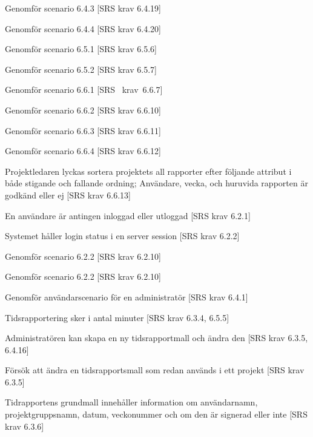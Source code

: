 \documentclass[a4paper]{article}
\begin{document}
\begin{appendices}
\begin{ST}
\item
Genomför scenario 6.4.3 [SRS krav 6.4.19]

\item
Genomför scenario 6.4.4 [SRS krav 6.4.20]

\item
Genomför scenario 6.5.1 [SRS krav 6.5.6]

\item
Genomför scenario 6.5.2 [SRS krav 6.5.7]

\item
Genomför scenario 6.6.1 [SRS~ krav~6.6.7]

\item
Genomför scenario 6.6.2 [SRS krav 6.6.10]

\item
Genomför scenario 6.6.3 [SRS krav 6.6.11]

\item
Genomför scenario 6.6.4 [SRS krav 6.6.12]

\item
Projektledaren lyckas sortera projektets all rapporter efter följande attribut i både stigande och fallande ordning; Användare, vecka, och huruvida rapporten är godkänd eller ej [SRS krav 6.6.13]


\item
En användare är antingen inloggad eller utloggad [SRS krav 6.2.1]

\item
Systemet håller login status i en server session [SRS krav 6.2.2]

\item
Genomför scenario 6.2.2 [SRS krav 6.2.10]

\item
Genomför scenario 6.2.2 [SRS krav 6.2.10]

\item
Genomför användarscenario för en administratör [SRS krav 6.4.1]

\item
Tidsrapportering sker i antal minuter [SRS krav 6.3.4, 6.5.5]

\item
Administratören kan skapa en ny tidsrapportmall och ändra den [SRS krav 6.3.5, 6.4.16]

\item
Försök att ändra en tidsrapportsmall som redan används i ett projekt [SRS krav 6.3.5]

\item
Tidrapportens grundmall innehåller information om användarnamn, projektgruppsnamn, datum, veckonummer och om den är signerad eller inte [SRS krav 6.3.6]


\end{ST}
\end{appendices}
\end{document}
